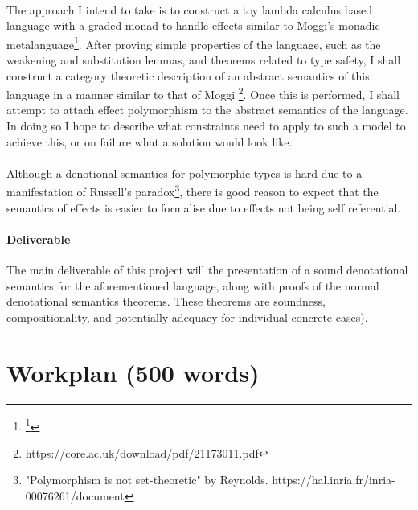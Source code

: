 \documentclass[11pt]{article}
\begin{document}
\paragraph{}{
The approach I intend to take is to construct a toy lambda calculus based language with a graded monad to handle effects similar to Moggi's monadic metalanguage\footnote{\footnote{Moggi, Notions of computation and monads: https://core.ac.uk/download/pdf/21173011.pdf}}. After proving simple properties of the language, such as the weakening and substitution lemmas, and theorems related to type safety, I shall construct a category theoretic description of an abstract semantics of this language in a manner similar to that of Moggi \footnote{https://core.ac.uk/download/pdf/21173011.pdf}. Once this is performed, I shall attempt to attach effect polymorphism to the abstract semantics of the language. In doing so I hope to describe what constraints need to apply to such a model to achieve this, or on failure what a solution would look like.}

\paragraph{}{
Although a denotional semantics for polymorphic types is hard due to a manifestation of Russell's paradox\footnote{"Polymorphism
is not set-theoretic" by Reynolds. https://hal.inria.fr/inria-00076261/document}, there is good reason to expect that the semantics of effects is easier to formalise due to effects not being self referential.
}




\paragraph{Deliverable}{
The main deliverable of this project will the presentation of a sound denotational semantics for the aforementioned language, along with proofs of the normal denotational semantics theorems. These theorems are soundness, compositionality, and potentially adequacy for individual concrete cases).
}



\section{Workplan (500 words)}
\end{document}

